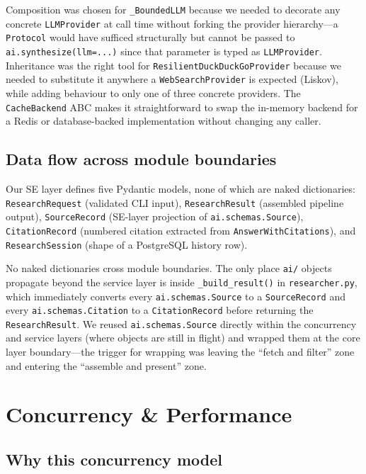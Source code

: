 \documentclass[11pt,a4paper]{article}
\begin{document}
Composition was chosen for \texttt{\_BoundedLLM} because we needed to decorate any
concrete \texttt{LLMProvider} at call time without forking the provider
hierarchy---a \texttt{Protocol} would have sufficed structurally but cannot be passed
to \texttt{ai.synthesize(llm=...)} since that parameter is typed as
\texttt{LLMProvider}. Inheritance was the right tool for
\texttt{ResilientDuckDuckGoProvider} because we needed to substitute it anywhere a
\texttt{WebSearchProvider} is expected (Liskov), while adding behaviour to only one of
three concrete providers. The \texttt{CacheBackend} ABC makes it straightforward to
swap the in-memory backend for a Redis or database-backed implementation without
changing any caller.

\subsection{Data flow across module boundaries}

Our SE layer defines five Pydantic models, none of which are naked dictionaries:
\texttt{ResearchRequest} (validated CLI input),
\texttt{ResearchResult} (assembled pipeline output),
\texttt{SourceRecord} (SE-layer projection of \texttt{ai.schemas.Source}),
\texttt{CitationRecord} (numbered citation extracted from \texttt{AnswerWithCitations}),
and \texttt{ResearchSession} (shape of a PostgreSQL history row).

No naked dictionaries cross module boundaries. The only place \texttt{ai/} objects
propagate beyond the service layer is inside \texttt{\_build\_result()} in
\texttt{researcher.py}, which immediately converts every \texttt{ai.schemas.Source} to
a \texttt{SourceRecord} and every \texttt{ai.schemas.Citation} to a
\texttt{CitationRecord} before returning the \texttt{ResearchResult}. We reused
\texttt{ai.schemas.Source} directly within the concurrency and service layers (where
objects are still in flight) and wrapped them at the core layer boundary---the trigger
for wrapping was leaving the ``fetch and filter'' zone and entering the ``assemble and
present'' zone.

\section{Concurrency \& Performance}\label{sec:concurrency}

\subsection{Why this concurrency model}
\end{document}
